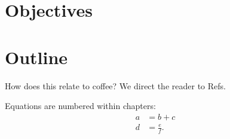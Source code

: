 \section{Objectives}

\section{Outline}

How does this relate to coffee? We direct the reader to Refs.

Equations are numbered within chapters:
\begin{align}
    a
    &= b + c \\
    d
    &= \frac{e}{f}.
\end{align}

% 
% 
% 
% 
